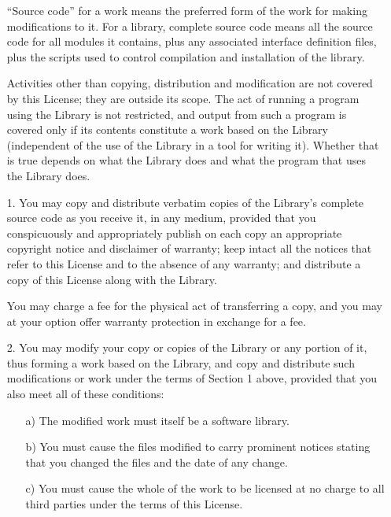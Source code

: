 \begin{multicols}{3}
\begin{itemize}
   ``Source code'' for a work means the preferred form of the work for making
   modifications to it. For a library, complete source code means all the
   source code for all modules it contains, plus any associated interface
   definition files, plus the scripts used to control compilation and
   installation of the library.

   Activities other than copying, distribution and modification are not
   covered by this License; they are outside its scope. The act of running
   a program using the Library is not restricted, and output from such a
   program is covered only if its contents constitute a work based on the
   Library (independent of the use of the Library in a tool for writing
   it). Whether that is true depends on what the Library does and what the
   program that uses the Library does.
   
 \item[1.] You may copy and distribute verbatim copies of the
   Library's complete source code as you receive it, in any medium,
   provided that you conspicuously and appropriately publish on each
   copy an appropriate copyright notice and disclaimer of warranty;
   keep intact all the notices that refer to this License and to the
   absence of any warranty; and distribute a copy of this License
   along with the Library.

   You may charge a fee for the physical act of transferring a copy, and
   you may at your option offer warranty protection in exchange for a fee.
   
 \item[2.] You may modify your copy or copies of the Library or any
   portion of it, thus forming a work based on the Library, and copy
   and distribute such modifications or work under the terms of
   Section 1 above, provided that you also meet all of these
   conditions:

   \begin{itemize}
   \item[a)] The modified work must itself be a software library.
     
   \item[b)] You must cause the files modified to carry prominent
     notices stating that you changed the files and the date of any
     change.
     
   \item[c)] You must cause the whole of the work to be licensed at no
     charge to all third parties under the terms of this License.
     

\end{itemize}
\end{itemize}
\end{multicols}
